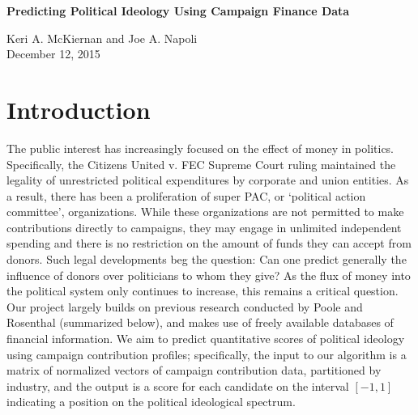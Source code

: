 \documentclass[12]{article}
\begin{document}
\begin{center}
\huge{\textbf{Predicting Political Ideology Using Campaign Finance Data}} \\
\end{center}
\begin{center}
\large{Keri A. McKiernan and Joe A. Napoli \\
\vspace{.25em}
December 12, 2015}
\end{center}
\section*{Introduction}

\noindent The public interest has increasingly focused on the effect of money in politics. Specifically, the Citizens United v. FEC Supreme Court ruling maintained the legality of unrestricted political expenditures by corporate and union entities. As a result, there has been a proliferation of super PAC, or `political action committee',  organizations. While these organizations are not permitted to make contributions directly to campaigns, they may engage in unlimited independent spending and there is no restriction on the amount of funds they can accept from donors. Such legal developments beg the question: Can one predict generally the influence of donors over politicians to whom they give? As the flux of money into the political system only continues to increase, this remains a critical question. Our project largely builds on previous research conducted by Poole and Rosenthal (summarized below), and makes use of freely available databases of financial information. We aim to predict quantitative scores of political ideology using campaign contribution profiles; specifically, the input to our algorithm is a matrix of normalized vectors of campaign contribution data, partitioned by industry, and the output is a score for each candidate on the interval $[-1,1]$ indicating a position on the political ideological spectrum.
\end{document}
